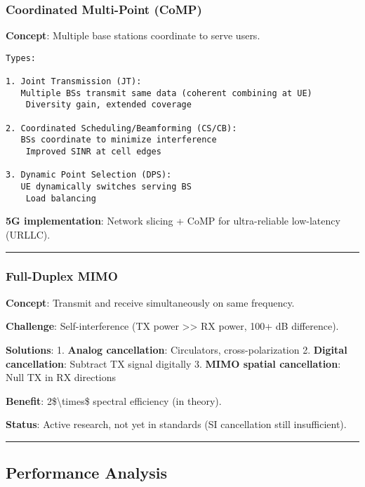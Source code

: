 \subsubsection{Coordinated Multi-Point
(CoMP)}\label{coordinated-multi-point-comp}

\textbf{Concept}: Multiple base stations coordinate to serve users.

\begin{verbatim}
Types:

1. Joint Transmission (JT):
   Multiple BSs transmit same data (coherent combining at UE)
    Diversity gain, extended coverage

2. Coordinated Scheduling/Beamforming (CS/CB):
   BSs coordinate to minimize interference
    Improved SINR at cell edges

3. Dynamic Point Selection (DPS):
   UE dynamically switches serving BS
    Load balancing
\end{verbatim}

\textbf{5G implementation}: Network slicing + CoMP for ultra-reliable
low-latency (URLLC).

\begin{center}\rule{0.5\linewidth}{0.5pt}\end{center}

\subsubsection{Full-Duplex MIMO}\label{full-duplex-mimo}

\textbf{Concept}: Transmit and receive simultaneously on same frequency.

\textbf{Challenge}: Self-interference (TX power
\textgreater\textgreater{} RX power, 100+ dB difference).

\textbf{Solutions}: 1. \textbf{Analog cancellation}: Circulators,
cross-polarization 2. \textbf{Digital cancellation}: Subtract TX signal
digitally 3. \textbf{MIMO spatial cancellation}: Null TX in RX
directions

\textbf{Benefit}: 2\$\textbackslash times\$ spectral efficiency (in
theory).

\textbf{Status}: Active research, not yet in standards (SI cancellation
still insufficient).

\begin{center}\rule{0.5\linewidth}{0.5pt}\end{center}

\subsection{\texorpdfstring{ Performance
Analysis}{ Performance Analysis}}\label{performance-analysis}

